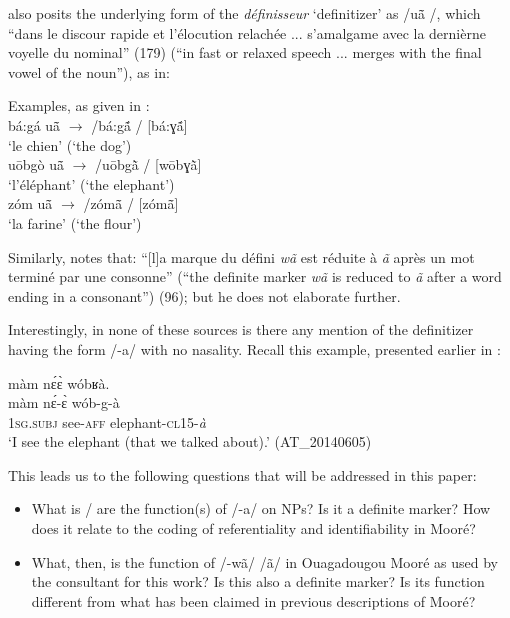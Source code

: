 \documentclass[output=paper]{langsci/langscibook}
\begin{document}
\cite{canu1974} also posits the underlying form of the \textit{définisseur} ‘definitizer’ as /uã\={} /, which “dans le discour rapide et l’élocution relachée ... s’amalgame avec la dernièrne voyelle du nominal” (179) (“in fast or relaxed speech ... merges with the final vowel of the noun”), as in:

\ea\label{ex:teo:12}
Examples, as given in \citet[179]{canu1974}:\\
bá:gá u\={ã}  \textup{${\rightarrow}$}\textup{ /bá:g\'{ã} / [bá:ɣ\'{ã}]} \\
‘le chien’ (‘the dog’)\\

u\={o}bgò u\={ã}  \textup{${\rightarrow}$}\textup{ /u\={o}bg\`{ã} / [w\={o}bɣ\`{ã}]} \\
‘l’éléphant’ (‘the elephant’)\\

zóm u\={ã}  \textup{${\rightarrow}$}\textup{ /zóm\={ã} / [zóm\={ã}]} \\
‘la farine’ (‘the flour’)
\z

Similarly, \cite{Nikiema1989} notes that: “[l]a marque du défini \textit{wã} est réduite à \textit{ã} après un mot terminé par une consonne” (“the definite marker \textit{wã} is reduced to \textit{ã} after a word ending in a consonant”) (96); but he does not elaborate further.

Interestingly, in none of these sources is there any mention of the definitizer having the form /-a/ with no nasality. Recall this example, presented earlier in :

\ea\label{ex:teo:4repeated}
\glll màm n\'ɛ\`ɛ wóbʁà.\\
 màm n\'ɛ-\`ɛ wób-g-à\\
\textsc{1sg.subj} see-\textsc{aff} elephant-\textsc{cl15-}\textit{à} \\
\glt ‘I see the elephant (that we talked about).’ (AT\_20140605)
\z

This leads us to the following questions that will be addressed in this paper:
 
\begin{itemize}
	\item What is / are the function(s) of /-a/ on NPs? Is it a definite marker? How does it relate to the coding of referentiality and identifiability in Mooré?
\item What, then, is the function of /-wã/ {\Tilde} /ã/ in Ouagadougou Mooré as used by the consultant for this work? Is this also a definite marker? Is its function different from what has been claimed in previous descriptions of Mooré?
\end{itemize}
\end{document}
